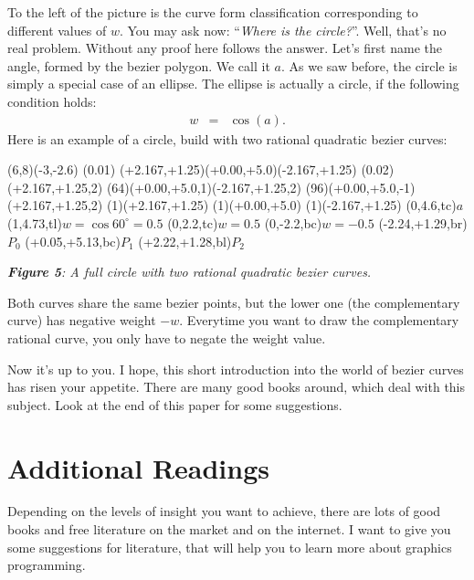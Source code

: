 \documentclass[titlepage,a4paper,11pt]{report}
\def\it{\textit}
\def\bf{\textbf}
\begin{document}
To the left of the picture is the curve form classification corresponding to
different values of $w$. You may ask now: ``\it{Where is the circle?}''. Well, that's no real problem. Without any proof here follows the answer. Let's first name the angle, formed by the bezier polygon. We call it $a$. As we saw before, the circle is simply a special case of an ellipse. The ellipse is actually a circle, if the following condition holds:
\begin{eqnarray}
  w & = & \cos(a).
\end{eqnarray}
Here is an example of a circle, build with two rational quadratic bezier curves:
\begin{center}
\begin{lapdf}(6,8)(-3,-2.6)
  \Setwidth(0.01)
  \Black
  \Polygon(+2.167,+1.25)(+0.00,+5.0)(-2.167,+1.25) \Stroke
  \Setwidth(0.02)
  \Red
  \Rmoveto(+2.167,+1.25,2)
  \Rcurveto(64)(+0.00,+5.0,1)(-2.167,+1.25,2)
  \Rcurveto(96)(+0.00,+5.0,-1)(+2.167,+1.25,2) \Stroke
  \Point(1)(+2.167,+1.25)
  \Point(1)(+0.00,+5.0)
  \Point(1)(-2.167,+1.25)
  \Text(0,4.6,tc){$a$}
  \Text(1,4.73,tl){$w=\cos 60^\circ=0.5$}
  \Text(0,2.2,tc){$w=0.5$}
  \Text(0,-2.2,bc){$w=-0.5$}
  \Text(-2.24,+1.29,br){$P_0$}
  \Text(+0.05,+5.13,bc){$P_1$}
  \Text(+2.22,+1.28,bl){$P_2$}
\end{lapdf}

\it{\bf{Figure 5}: A full circle with two rational quadratic bezier curves.}
\end{center}
Both curves share the same bezier points, but the lower one (the complementary curve) has negative weight $-w$. Everytime you want to draw the complementary rational curve, you only have to negate the weight value.

Now it's up to you. I hope, this short introduction into the world of bezier
curves has risen your appetite. There are many good books around, which deal
with this subject. Look at the end of this paper for some suggestions.

\section{Additional Readings}
Depending on the levels of insight you want to achieve, there are lots of
good books and free literature on the market and on the internet. I want
to give you some suggestions for literature, that will help you to learn
more about graphics programming.
\end{document}
